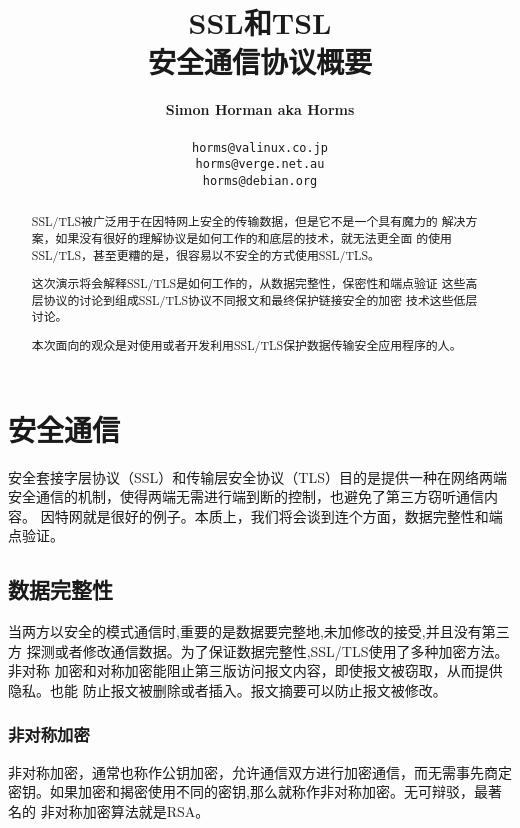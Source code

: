 \documentclass[11pt]{article}
\title{SSL和TSL\\
安全通信协议概要}
\author{\textbf{Simon Horman aka Horms} \\
        \\
\texttt{horms@valinux.co.jp}\\
\texttt{horms@verge.net.au}\\
\texttt{horms@debian.org}}
\date{}
\begin{document}
\maketitle
\pagebreak

\begin{abstract}

          SSL/TLS被广泛用于在因特网上安全的传输数据，但是它不是一个具有魔力的
        解决方案，如果没有很好的理解协议是如何工作的和底层的技术，就无法更全面
        的使用SSL/TLS，甚至更糟的是，很容易以不安全的方式使用SSL/TLS。

        这次演示将会解释SSL/TLS是如何工作的，从数据完整性，保密性和端点验证
        这些高层协议的讨论到组成SSL/TLS协议不同报文和最终保护链接安全的加密
        技术这些低层讨论。

        本次面向的观众是对使用或者开发利用SSL/TLS保护数据传输安全应用程序的人。


\end{abstract}

\tableofcontents

\section{安全通信}

安全套接字层协议（SSL）和传输层安全协议（TLS）目的是提供一种在网络两端
安全通信的机制，使得两端无需进行端到断的控制，也避免了第三方窃听通信内容。
因特网就是很好的例子。本质上，我们将会谈到连个方面，数据完整性和端点验证。
\\

\subsection{数据完整性}
当两方以安全的模式通信时,重要的是数据要完整地,未加修改的接受,并且没有第三方
探测或者修改通信数据。为了保证数据完整性,SSL/TLS使用了多种加密方法。非对称
加密和对称加密能阻止第三版访问报文内容，即使报文被窃取，从而提供隐私。也能
防止报文被删除或者插入。报文摘要可以防止报文被修改。\\

\subsubsection{非对称加密}
非对称加密，通常也称作公钥加密，允许通信双方进行加密通信，而无需事先商定
密钥。如果加密和揭密使用不同的密钥,那么就称作非对称加密。无可辩驳，最著名的
非对称加密算法就是RSA。\\
\end{document}
